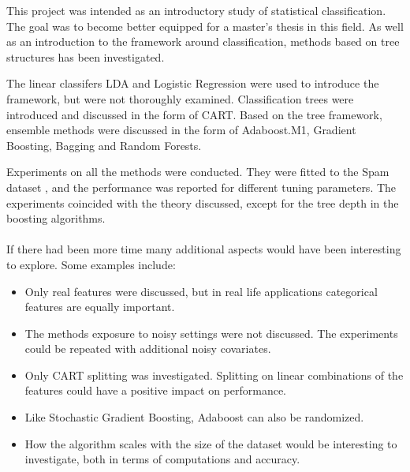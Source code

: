 
This project was intended as an introductory study of statistical classification. The goal was to become better equipped for a master's thesis in this field. 
As well as an introduction to the framework around classification, methods based on tree structures has been investigated. 

The linear classifers LDA and Logistic Regression were used to introduce the framework, but were not thoroughly examined. 
Classification trees were introduced and discussed in the form of CART. Based on the tree framework, ensemble methods were discussed in the form of Adaboost.M1, Gradient Boosting, Bagging and Random Forests.

Experiments on all the methods were conducted. They were fitted to the Spam dataset \cite{Spamdata}, and the performance was reported for different tuning parameters. The experiments coincided with the theory discussed, except for the tree depth in the boosting algorithms. 
\\
\\
If there had been more time many additional aspects would have been interesting to explore. Some examples include:
\begin{itemize}
  \item Only real features were discussed, but in real life applications categorical features are equally important. 
  \item The methods exposure to noisy settings were not discussed. The experiments could be repeated with additional noisy covariates. 
  \item Only CART splitting was investigated. Splitting on linear combinations of the features could have a positive impact on performance. 
  \item Like Stochastic Gradient Boosting, Adaboost can also be randomized. 
  \item How the algorithm scales with the size of the dataset would be interesting to investigate, both in terms of computations and accuracy.
\end{itemize}
